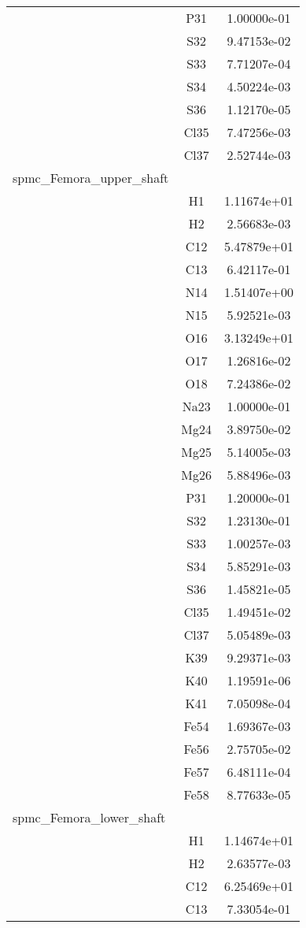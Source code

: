 \begin{centering}
\begin{longtable}{l c c}
& P31 & 1.00000e-01 \\ 
& S32 & 9.47153e-02 \\ 
& S33 & 7.71207e-04 \\ 
& S34 & 4.50224e-03 \\ 
& S36 & 1.12170e-05 \\ 
& Cl35 & 7.47256e-03 \\ 
& Cl37 & 2.52744e-03 \\ 
\hline
spmc\_Femora\_upper\_shaft & & \\
\hline
& H1 & 1.11674e+01 \\ 
& H2 & 2.56683e-03 \\ 
& C12 & 5.47879e+01 \\ 
& C13 & 6.42117e-01 \\ 
& N14 & 1.51407e+00 \\ 
& N15 & 5.92521e-03 \\ 
& O16 & 3.13249e+01 \\ 
& O17 & 1.26816e-02 \\ 
& O18 & 7.24386e-02 \\ 
& Na23 & 1.00000e-01 \\ 
& Mg24 & 3.89750e-02 \\ 
& Mg25 & 5.14005e-03 \\ 
& Mg26 & 5.88496e-03 \\ 
& P31 & 1.20000e-01 \\ 
& S32 & 1.23130e-01 \\ 
& S33 & 1.00257e-03 \\ 
& S34 & 5.85291e-03 \\ 
& S36 & 1.45821e-05 \\ 
& Cl35 & 1.49451e-02 \\ 
& Cl37 & 5.05489e-03 \\ 
& K39 & 9.29371e-03 \\ 
& K40 & 1.19591e-06 \\ 
& K41 & 7.05098e-04 \\ 
& Fe54 & 1.69367e-03 \\ 
& Fe56 & 2.75705e-02 \\ 
& Fe57 & 6.48111e-04 \\ 
& Fe58 & 8.77633e-05 \\ 
\hline
spmc\_Femora\_lower\_shaft & & \\
\hline
& H1 & 1.14674e+01 \\ 
& H2 & 2.63577e-03 \\ 
& C12 & 6.25469e+01 \\ 
& C13 & 7.33054e-01 \\ 

\end{longtable}
\end{centering}

